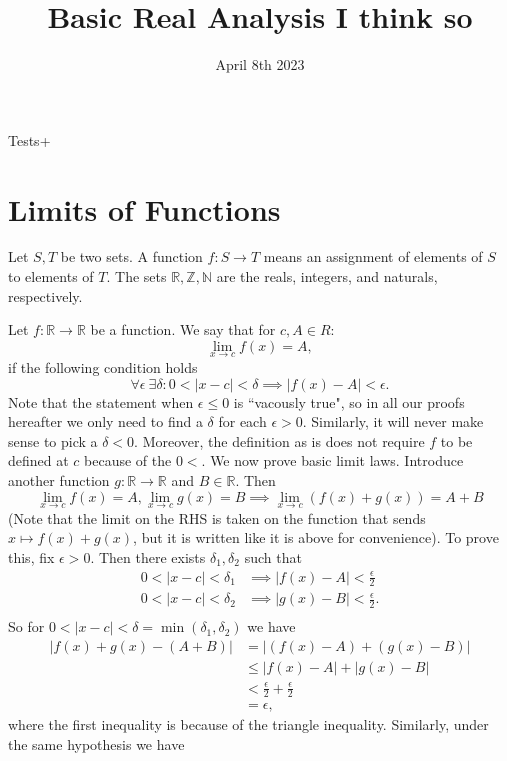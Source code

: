 \documentclass{article}[11pt]
\title{Basic Real Analysis I think so}
\date{April 8th 2023}
\author{}
\newcommand{\R}{\mathbb{R}}
\newcommand{\Z}{\mathbb{Z}}
\newcommand{\N}{\mathbb{N}}
\newcommand{\eps}{\epsilon}
\begin{document}
    \maketitle
    {\color{red} Tests+}
    \section{Limits of Functions}
    Let $S, T$ be two sets. A function $f: S \to T$ means an assignment of elements of $S$ to elements of $T$. The sets $\R, \Z, \N$ are the reals, integers, and naturals, respectively.

    Let $f: \R \to \R$ be a function. We say that for $c, A \in R$:
    $$ \lim_{x \to c} f(x) = A ,$$
    if the following condition holds
    $$ \forall \eps~\exists \delta : 0 < |x - c| < \delta \implies |f(x) - A| < \eps .$$
    Note that the statement when $\eps \leq 0$ is ``vacously true", so in all our proofs hereafter we only need to find a $\delta$ for each $\eps > 0$. Similarly, it will never make sense to pick a $\delta < 0$. Moreover, the definition as is does not require $f$ to be defined at $c$ because of the $0 < $.
    We now prove basic limit laws. Introduce another function $g: \R \to \R$ and $B \in \R$. Then
    $$ \lim_{x \to c} f(x) = A, \lim_{x \to c} g(x) = B \implies \lim_{x \to c} \left(f(x) + g(x)\right) = A + B $$
    (Note that the limit on the RHS is taken on the function that sends $x \mapsto f(x) + g(x)$, but it is written like it is above for convenience). To prove this, fix $\epsilon > 0$. Then there exists $\delta_1, \delta_2$ such that 
    \begin{align*}
        0 < |x - c| < \delta_1 &\implies |f(x) - A| < \frac{\eps}{2} \\
        0 < |x - c| < \delta_2 &\implies |g(x) - B| < \frac{\eps}{2} .\\
    \end{align*}
    So for $0 < |x - c| < \delta = \min\left(\delta_1, \delta_2\right)$ we have
    \begin{align*}
        |f(x) + g(x) - (A + B)| &= |(f(x) - A) + (g(x) - B)| \\
                                &\leq |f(x) - A| + |g(x) - B| \\
                                &< \frac{\eps}{2} + \frac{\eps}{2} \\
                                &= \eps,
    \end{align*}
    where the first inequality is because of the triangle inequality. Similarly, under the same hypothesis we have
\end{document}
